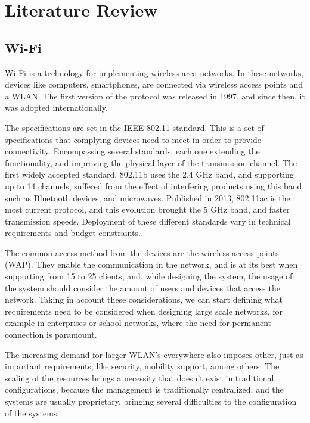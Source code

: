\chapter{Literature Review} \label{chap:bib} %

\section {Wi-Fi}
\hspace {5mm} 

Wi-Fi is a technology for implementing wireless area networks. In these networks, devices like computers, smartphones, are connected via wireless access points and a WLAN. The first version of the protocol was released in 1997, and since then, it was adopted internationally.   

\par The specifications are set in the IEEE 802.11 standard. This is a set of specifications that complying devices need to meet in order to provide connectivity. Encompassing several standards, each one extending the functionality, and improving the physical layer of the transmission channel. The first widely accepted standard, 802.11b uses the 2.4 GHz band, and supporting up to 14 channels, suffered from the effect of interfering products using this band, such as Bluetooth devices, and microwaves. Published in 2013, 802.11ac is the most current protocol, and this evolution brought the 5 GHz band, and faster transmission speeds. Deployment of these different standards vary in technical requirements and budget constraints.

\par The common access method from the devices are the wireless access points (WAP). They enable the communication in the network, and is at its best when supporting from 15 to 25 clients, and, while designing the system, the usage of the system should consider the amount of users and devices that access the network. Taking in account these considerations, we can start defining what requirements need to be considered when designing large scale networks, for example in enterprises or school networks, where the need for permanent connection is paramount. 

\par The increasing demand for larger WLAN's everywhere also imposes other, just as important requirements, like security, mobility support, among others. The scaling of the resources brings a necessity that doesn't exist in traditional configurations, because the management is traditionally centralized, and the systems are usually proprietary, bringing several difficulties to the configuration of the systems.

